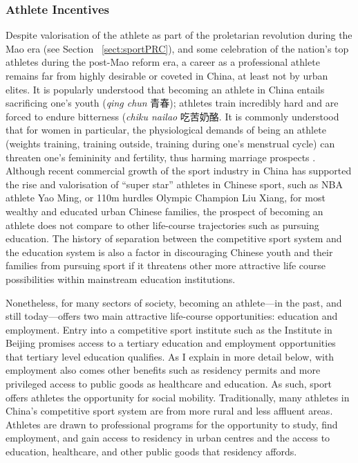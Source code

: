 \begin{CJK}{UTF8}{gbsn}
\subsubsection{Athlete Incentives}
Despite valorisation of the athlete as part of the proletarian revolution during the Mao era (see Section ~\ref{sect:sportPRC}), and some celebration of the nation's top athletes during the post-Mao reform era, a career as a professional athlete remains far from highly desirable or coveted in China, at least not by urban elites.  It is popularly understood that becoming an athlete in China entails sacrificing one's youth (\textit{qing chun} 青春); athletes train incredibly hard and are forced to endure bitterness (\textit{chiku nailao} 吃苦奶酪. It is commonly understood that for women in particular, the physiological demands of being an athlete (weights training, training outside, training during one's menstrual cycle) can threaten one's femininity and fertility, thus harming marriage prospects \citep{Bronwell1995}.  Although recent commercial growth of the sport industry in China has supported the rise and valorisation of ``super star'' athletes in Chinese sport, such as NBA athlete Yao Ming, or 110m hurdles Olympic Champion Liu Xiang, for most wealthy and educated urban Chinese families, the prospect of becoming an athlete does not compare to other life-course trajectories such as pursuing education.  The history of separation between the competitive sport system and the education system is also a factor in discouraging Chinese youth and their families from pursuing sport if it threatens other more attractive life course possibilities within mainstream education institutions.

Nonetheless, for many sectors of society, becoming an athlete---in the past, and still today---offers two main attractive life-course opportunities: education and employment.  Entry into a competitive sport institute such as the Institute in Beijing promises access to a tertiary education and employment opportunities that tertiary level education qualifies. As I explain in more detail below, with employment also comes other benefits such as residency permits and more privileged access to public goods as healthcare and education.  As such, sport offers athletes the opportunity for social mobility.  Traditionally, many athletes in China's competitive sport system are from more rural and less affluent areas.  Athletes are drawn to professional programs for the opportunity to study, find employment, and gain access to residency in urban centres and the access to education, healthcare, and other public goods that residency affords.



\end{CJK}
